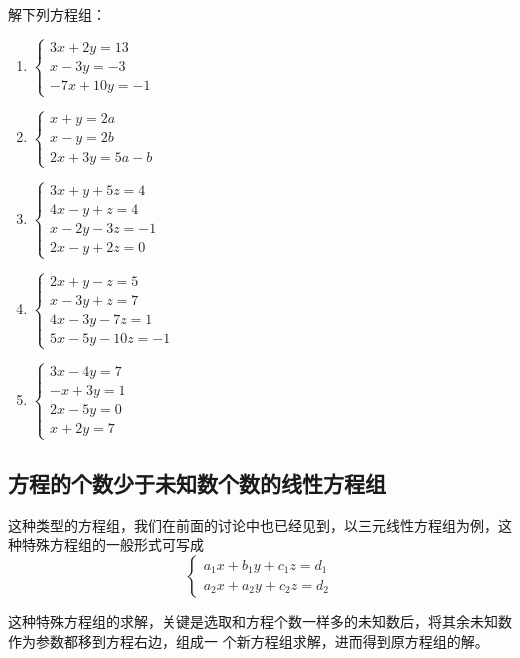 \begin{ex}
解下列方程组：
\begin{multicols}{2}
\begin{enumerate}
\item  $\begin{cases}
    3 x+2 y=13 \\ x-3 y=-3 \\ -7 x+10 y=-1 
\end{cases}$
\item $\begin{cases}x+y=2 a \\ x-y=2 b \\ 2 x+3 y=5 a-b\end{cases}$
    \item $\begin{cases}3 x+y+5 z=4 \\ 4 x-y+z=4 \\ x-2 y-3 z=-1 \\ 2 x-y+2 z=0\end{cases}$
        \item $\begin{cases}2 x+y-z=5 \\ x-3 y+z=7 \\ 4 x-3 y-7 z=1 \\ 5 x-5 y-10 z=-1\end{cases}$
            \item $\begin{cases}3 x-4 y=7 \\ -x+3 y=1 \\ 2 x-5 y=0 \\ x+2 y=7\end{cases}$
\end{enumerate}
\end{multicols}
\end{ex}

\subsection{方程的个数少于未知数个数的线性方程组}
这种类型的方程组，我们在前面的讨论中也已经见到，以三元线性方程组为例，这种特殊方程组的一般形式可写成
\[\begin{cases}
    a_1x+b_1y+c_1z=d_1\\
    a_2x+a_2y+c_2z=d_2
\end{cases}\]

这种特殊方程组的求解，关键是选取和方程个数一样多的未知数后，将其余未知数作为参数都移到方程右边，组成一
个新方程组求解，进而得到原方程组的解。

